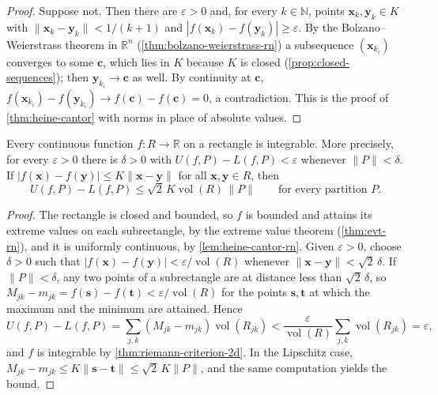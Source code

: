 \begin{proof}
Suppose not. Then there are $\varepsilon>0$ and, for every $k\in\mathbb N$, points $\mathbf x_k,\mathbf y_k\in K$ with $\|\mathbf x_k-\mathbf y_k\|<1/(k+1)$ and $|f(\mathbf x_k)-f(\mathbf y_k)|\ge\varepsilon$. By the Bolzano--Weierstrass theorem in $\mathbb R^n$ (\cref{thm:bolzano-weierstrass-rn}) a subsequence $(\mathbf x_{k_i})$ converges to some $\mathbf c$, which lies in $K$ because $K$ is closed (\cref{prop:closed-sequences}); then $\mathbf y_{k_i}\to\mathbf c$ as well. By continuity at $\mathbf c$, $f(\mathbf x_{k_i})-f(\mathbf y_{k_i})\to f(\mathbf c)-f(\mathbf c)=0$, a contradiction. This is the proof of \cref{thm:heine-cantor} with norms in place of absolute values.
\end{proof}

\begin{theorem}
\label{thm:continuous-integrable-2d}
Every continuous function $f\colon R\to\mathbb R$ on a rectangle is integrable. More precisely, for every $\varepsilon>0$ there is $\delta>0$ with $U(f,P)-L(f,P)<\varepsilon$ whenever $\|P\|<\delta$. If $|f(\mathbf x)-f(\mathbf y)|\le K\|\mathbf x-\mathbf y\|$ for all $\mathbf x,\mathbf y\in R$, then
\[
U(f,P)-L(f,P)\le\sqrt2\,K\operatorname{vol}(R)\,\|P\|\qquad\text{for every partition }P .
\]
\end{theorem}

\begin{proof}
The rectangle is closed and bounded, so $f$ is bounded and attains its extreme values on each subrectangle, by the extreme value theorem (\cref{thm:evt-rn}), and it is uniformly continuous, by \cref{lem:heine-cantor-rn}. Given $\varepsilon>0$, choose $\delta>0$ such that $|f(\mathbf x)-f(\mathbf y)|<\varepsilon/\operatorname{vol}(R)$ whenever $\|\mathbf x-\mathbf y\|<\sqrt2\,\delta$. If $\|P\|<\delta$, any two points of a subrectangle are at distance less than $\sqrt2\,\delta$, so $M_{jk}-m_{jk}=f(\mathbf s)-f(\mathbf t)<\varepsilon/\operatorname{vol}(R)$ for the points $\mathbf s,\mathbf t$ at which the maximum and the minimum are attained. Hence
\[
U(f,P)-L(f,P)=\sum_{j,k}(M_{jk}-m_{jk})\operatorname{vol}(R_{jk})<\frac\varepsilon{\operatorname{vol}(R)}\sum_{j,k}\operatorname{vol}(R_{jk})=\varepsilon ,
\]
and $f$ is integrable by \cref{thm:riemann-criterion-2d}. In the Lipschitz case, $M_{jk}-m_{jk}\le K\|\mathbf s-\mathbf t\|\le\sqrt2\,K\|P\|$, and the same computation yields the bound.
\end{proof}

